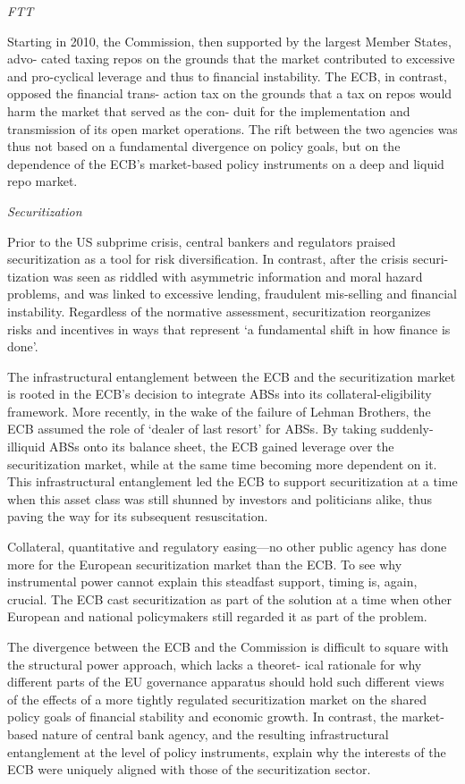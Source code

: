 \documentclass[
]{book}
\begin{document}
\emph{FTT}

Starting in 2010, the Commission, then supported by the largest Member States, advo-
cated taxing repos on the grounds that the market contributed to excessive and pro-cyclical
leverage and thus to financial instability. The ECB, in contrast, opposed the financial trans-
action tax on the grounds that a tax on repos would harm the market that served as the con-
duit for the implementation and transmission of its open market operations. The rift
between the two agencies was thus not based on a fundamental divergence on policy goals,
but on the dependence of the ECB's market-based policy instruments on a deep and liquid
repo market.

\emph{Securitization}

Prior to the US subprime crisis, central bankers and regulators
praised securitization as a tool for risk diversification. In contrast, after the crisis securi-
tization was seen as riddled with asymmetric information and moral hazard problems, and
was linked to excessive lending, fraudulent mis-selling and financial instability.
Regardless of the normative assessment, securitization
reorganizes risks and incentives in ways that represent `a fundamental shift in how finance is
done'.

The infrastructural entanglement between the ECB and the securitization market is
rooted in the ECB's decision to integrate ABSs into its collateral-eligibility framework.
More recently, in the wake of the failure of Lehman Brothers, the ECB
assumed the role of `dealer of last resort' for ABSs. By taking suddenly-
illiquid ABSs onto its balance sheet, the ECB gained leverage over the securitization market,
while at the same time becoming more dependent on it. This infrastructural entanglement
led the ECB to support securitization at a time when this asset class was still shunned by
investors and politicians alike, thus paving the way for its subsequent resuscitation.

Collateral, quantitative and regulatory easing---no other public agency has done more
for the European securitization market than the ECB. To see why instrumental power
cannot explain this steadfast support, timing is, again, crucial. The ECB cast securitization as
part of the solution at a time when other European and national policymakers still regarded
it as part of the problem.

The divergence between the ECB and the
Commission is difficult to square with the structural power approach, which lacks a theoret-
ical rationale for why different parts of the EU governance apparatus should hold such
different views of the effects of a more tightly regulated securitization market on the shared
policy goals of financial stability and economic growth. In contrast, the market-based nature
of central bank agency, and the resulting infrastructural entanglement at the level of policy
instruments, explain why the interests of the ECB were uniquely aligned with those of the
securitization sector.
\end{document}
